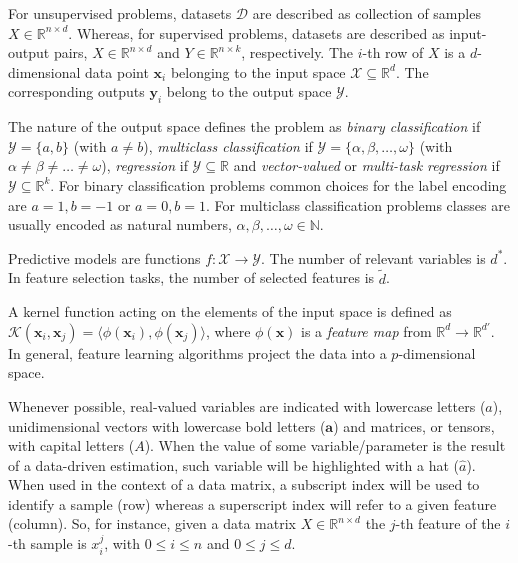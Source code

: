 For unsupervised problems, datasets $\mathcal{D}$ are described as collection of samples $X \in \mathbb{R}^{n \times d}$. Whereas, for supervised problems, datasets are described as input-output pairs, $X \in \mathbb{R}^{n \times d}$ and $Y \in \mathbb{R}^{n \times k}$, respectively.
The $i$-th row of $X$ is a $d$-dimensional data point $\bm{x}_{i}$ belonging to the input space $\mathcal{X}\subseteq\mathds{R}^d$. The corresponding outputs $\bm{y}_{i}$ belong to the output space $\mathcal{Y}$.

The nature of the output space defines the problem as \textit{binary classification} if  $\mathcal{Y} = \{a,b\}$ (with $a\neq b$), \textit{multiclass classification} if
$\mathcal{Y} = \{\alpha,\beta,\dots,\omega\}$
(with $\alpha \neq \beta \neq \dots \neq \omega$),
\textit{regression} if $\mathcal{Y}\subseteq\mathds{R}$ and
\textit{vector-valued} or \textit{multi-task regression} if $\mathcal{Y}\subseteq\mathds{R}^k$.
For binary classification problems common choices for the label encoding are $a=1, b=-1$ or $a=0, b=1$.
For multiclass classification problems classes are usually encoded as natural numbers, \ie $\alpha, \beta, \dots, \omega \in \mathbb{N}$.

Predictive models are functions $f: \mathcal{X} \rightarrow \mathcal{Y}$.
The number of relevant variables is $d^*$.
In feature selection tasks, the number of selected features is $\tilde d$.

A kernel function acting on the elements of the input space is defined as $\mathcal{K}(\bm{x}_{i},\bm{x}_{j})=\langle \phi(\bm{x}_{i}), \phi(\bm{x}_{j})\rangle$, where $\phi(\bm{x})$ is a {\em feature map} from $\mathds{R}^d \rightarrow \mathds{R}^{d'}$.
In general, feature learning algorithms project the data into a $p$-dimensional space.

Whenever possible,
real-valued variables are indicated with lowercase letters (\eg $a$),
unidimensional vectors with lowercase bold letters (\eg $\bm{a}$) and
matrices, or tensors, with capital letters (\eg $A$).
When the value of some variable/parameter is the result of a data-driven estimation, such variable will be highlighted with a hat (\eg $\hat a$).
When used in the context of a data matrix, a subscript index will be used to identify a sample (row) whereas a superscript index will refer to a given feature (column).
So, for instance, given a data matrix $X \in \mathbb{R}^{n \times d}$ the $j$-th feature of the $i$-th sample is $x_i^j$, with $0 \leq i \leq n$ and $0\leq j\leq d$.
